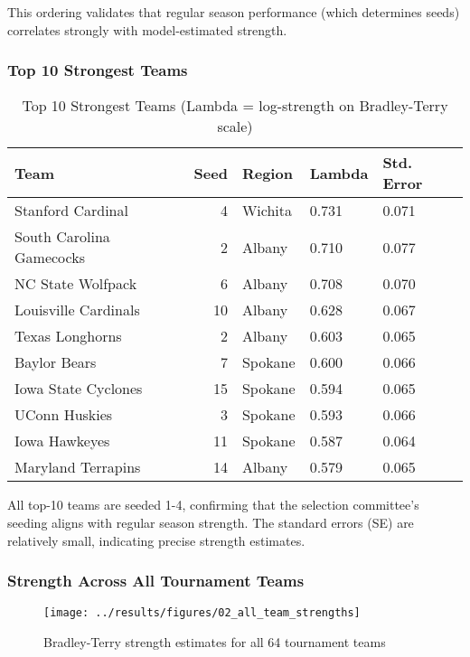 \documentclass[
]{article}
\begin{document}
This ordering validates that regular season performance (which
determines seeds) correlates strongly with model-estimated strength.

\subsubsection{Top 10 Strongest Teams}\label{top-10-strongest-teams}

\begin{longtable}[t]{lrlll}
\caption{\label{tab:top-teams}Top 10 Strongest Teams (Lambda = log-strength on Bradley-Terry scale)}\\
\toprule
Team & Seed & Region & Lambda & Std. Error\\
\midrule
Stanford Cardinal & 4 & Wichita & 0.731 & 0.071\\
South Carolina Gamecocks & 2 & Albany & 0.710 & 0.077\\
NC State Wolfpack & 6 & Albany & 0.708 & 0.070\\
Louisville Cardinals & 10 & Albany & 0.628 & 0.067\\
Texas Longhorns & 2 & Albany & 0.603 & 0.065\\
\addlinespace
Baylor Bears & 7 & Spokane & 0.600 & 0.066\\
Iowa State Cyclones & 15 & Spokane & 0.594 & 0.065\\
UConn Huskies & 3 & Spokane & 0.593 & 0.066\\
Iowa Hawkeyes & 11 & Spokane & 0.587 & 0.064\\
Maryland Terrapins & 14 & Albany & 0.579 & 0.065\\
\bottomrule
\end{longtable}

All top-10 teams are seeded 1-4, confirming that the selection
committee's seeding aligns with regular season strength. The standard
errors (SE) are relatively small, indicating precise strength estimates.

\subsubsection{Strength Across All Tournament
Teams}\label{strength-across-all-tournament-teams}

\begin{figure}

{\centering \texttt{[image: ../results/figures/02\_all\_team\_strengths]} 

}

\caption{Bradley-Terry strength estimates for all 64 tournament teams}\label{fig:all-teams-plot}
\end{figure}
\end{document}
